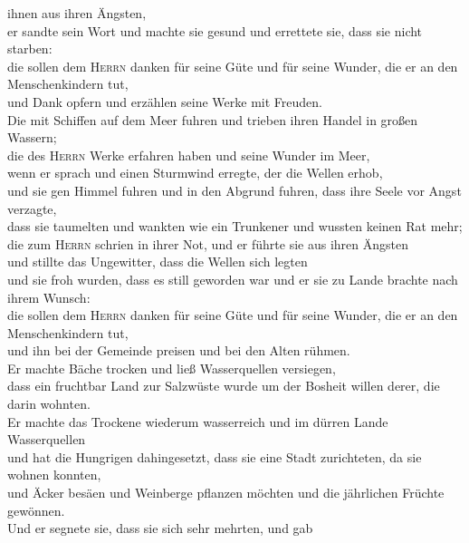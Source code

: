 ihnen aus ihren Ängsten,\\
 er sandte sein Wort und machte sie gesund und errettete
sie, dass sie nicht starben:\\
 die sollen dem \textsc{Herrn} danken für seine Güte und
für seine Wunder, die er an den Menschenkindern tut,\\
 und Dank opfern und erzählen seine Werke mit Freuden.\\
 Die mit Schiffen auf dem Meer fuhren und trieben ihren
Handel in großen Wassern;\\
 die des \textsc{Herrn} Werke erfahren haben und seine
Wunder im Meer,\\
 wenn er sprach und einen Sturmwind erregte, der die
Wellen erhob,\\
 und sie gen Himmel fuhren und in den Abgrund fuhren,
dass ihre Seele vor Angst verzagte,\\
 dass sie taumelten und wankten wie ein Trunkener und
wussten keinen Rat mehr;\\
 die zum \textsc{Herrn} schrien in ihrer Not, und er
führte sie aus ihren Ängsten\\
 und stillte das Ungewitter, dass die Wellen sich
legten\\
 und sie froh wurden, dass es still geworden war und er
sie zu Lande brachte nach ihrem Wunsch:\\
 die sollen dem \textsc{Herrn} danken für seine Güte und
für seine Wunder, die er an den Menschenkindern tut,\\
 und ihn bei der Gemeinde preisen und bei den Alten
rühmen.\\
 Er machte Bäche trocken und ließ Wasserquellen
versiegen,\\
 dass ein fruchtbar Land zur Salzwüste wurde um der
Bosheit willen derer, die darin wohnten.\\
 Er machte das Trockene wiederum wasserreich und im
dürren Lande Wasserquellen\\
 und hat die Hungrigen dahingesetzt, dass sie eine Stadt
zurichteten, da sie wohnen konnten,\\
 und Äcker besäen und Weinberge pflanzen möchten und die
jährlichen Früchte gewönnen.\\
 Und er segnete sie, dass sie sich sehr mehrten, und gab
